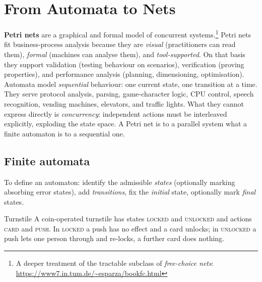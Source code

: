 \section{From Automata to Nets}

\textbf{Petri nets} are a graphical and formal model of concurrent systems.\footnote{A deeper treatment of the tractable subclass of \emph{free-choice nets}: \url{https://www7.in.tum.de/~esparza/bookfc.html}} Petri nets fit business-process analysis because they are \emph{visual} (practitioners can read them), \emph{formal} (machines can analyse them), and \emph{tool-supported}. On that basis they support validation (testing behaviour on scenarios), verification (proving properties), and performance analysis (planning, dimensioning, optimisation). Automata model \emph{sequential} behaviour: one current state, one transition at a time. They serve protocol analysis, parsing, game-character logic, CPU control, speech recognition, vending machines, elevators, and traffic lights. What they cannot express directly is \emph{concurrency}: independent actions must be interleaved explicitly, exploding the state space. A Petri net is to a parallel system what a finite automaton is to a sequential one.

\subsection{Finite automata}

To define an automaton: identify the admissible \emph{states} (optionally marking absorbing error states), add \emph{transitions}, fix the \emph{initial} state, optionally mark \emph{final} states.

\begin{examplebox}{Turnstile}
A coin-operated turnstile has states \textsc{locked} and \textsc{unlocked} and actions \textsc{card} and \textsc{push}. In \textsc{locked} a push has no effect and a card unlocks; in \textsc{unlocked} a push lets one person through and re-locks, a further card does nothing.
\begin{center}
\end{center}
\end{examplebox}

